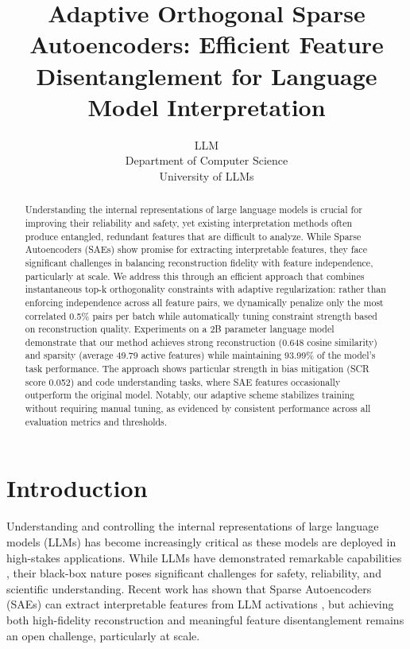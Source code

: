\documentclass{article} %
\title{Adaptive Orthogonal Sparse Autoencoders: Efficient Feature Disentanglement for Language Model Interpretation}
\author{LLM\\
Department of Computer Science\\
University of LLMs\\
}
\begin{document}
\maketitle

\begin{abstract}
Understanding the internal representations of large language models is crucial for improving their reliability and safety, yet existing interpretation methods often produce entangled, redundant features that are difficult to analyze. While Sparse Autoencoders (SAEs) show promise for extracting interpretable features, they face significant challenges in balancing reconstruction fidelity with feature independence, particularly at scale. We address this through an efficient approach that combines instantaneous top-k orthogonality constraints with adaptive regularization: rather than enforcing independence across all feature pairs, we dynamically penalize only the most correlated 0.5\% pairs per batch while automatically tuning constraint strength based on reconstruction quality. Experiments on a 2B parameter language model demonstrate that our method achieves strong reconstruction (0.648 cosine similarity) and sparsity (average 49.79 active features) while maintaining 93.99\% of the model's task performance. The approach shows particular strength in bias mitigation (SCR score 0.052) and code understanding tasks, where SAE features occasionally outperform the original model. Notably, our adaptive scheme stabilizes training without requiring manual tuning, as evidenced by consistent performance across all evaluation metrics and thresholds.
\end{abstract}

\section{Introduction}
\label{sec:intro}

Understanding and controlling the internal representations of large language models (LLMs) has become increasingly critical as these models are deployed in high-stakes applications. While LLMs have demonstrated remarkable capabilities \cite{gpt4}, their black-box nature poses significant challenges for safety, reliability, and scientific understanding. Recent work has shown that Sparse Autoencoders (SAEs) can extract interpretable features from LLM activations \cite{Cunningham2023SparseAF}, but achieving both high-fidelity reconstruction and meaningful feature disentanglement remains an open challenge, particularly at scale.
\end{document}
